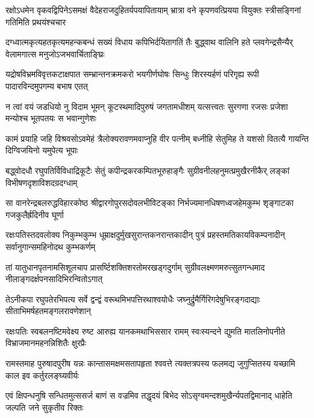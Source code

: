 \fourlineindentedshloka
{रक्षोऽधमेन वृकवद्विपिनेऽसमक्षं}
{वैदेहराजदुहितर्यपयापितायाम्}
{भ्रात्रा वने कृपणवत्प्रियया वियुक्तः}
{स्त्रीसङ्गिनां गतिमिति प्रथयंश्चचार} %

\fourlineindentedshloka
{दग्ध्वात्मकृत्यहतकृत्यमहन्कबन्धं}
{सख्यं विधाय कपिभिर्दयितागतिं तैः}
{बुद्ध्वाथ वालिनि हते प्लवगेन्द्रसैन्यैर्}
{वेलामगात्स मनुजोऽजभवार्चिताङ्घ्रिः} %

\fourlineindentedshloka
{यद्रोषविभ्रमविवृत्तकटाक्षपात}
{सम्भ्रान्तनक्रमकरो भयगीर्णघोषः}
{सिन्धुः शिरस्यर्हणं परिगृह्य रूपी}
{पादारविन्दमुपगम्य बभाष एतत्} %

\fourlineindentedshloka
{न त्वां वयं जडधियो नु विदाम भूमन्}
{कूटस्थमादिपुरुषं जगतामधीशम्}
{यत्सत्त्वतः सुरगणा रजसः प्रजेशा}
{मन्योश्च भूतपतयः स भवान्गुणेशः} %

\fourlineindentedshloka
{कामं प्रयाहि जहि विश्रवसोऽवमेहं}
{त्रैलोक्यरावणमवाप्नुहि वीर पत्नीम्}
{बध्नीहि सेतुमिह ते यशसो वितत्यै}
{गायन्ति दिग्विजयिनो यमुपेत्य भूपाः} %

\fourlineindentedshloka
{बद्ध्वोदधौ रघुपतिर्विविधाद्रिकूटैः}
{सेतुं कपीन्द्रकरकम्पितभूरुहाङ्गैः}
{सुग्रीवनीलहनुमत्प्रमुखैरनीकैर्}
{लङ्कां विभीषणदृशाविशदग्रदग्धाम्} %

\fourlineindentedshloka
{सा वानरेन्द्रबलरुद्धविहारकोष्ठ}
{श्रीद्वारगोपुरसदोवलभीविटङ्का}
{निर्भज्यमानधिषणध्वजहेमकुम्भ}
{शृङ्गाटका गजकुलैर्ह्रदिनीव घूर्णा} %

\fourlineindentedshloka
{रक्षःपतिस्तदवलोक्य निकुम्भकुम्भ}
{धूम्राक्षदुर्मुखसुरान्तकनरान्तकादीन्}
{पुत्रं प्रहस्तमतिकायविकम्पनादीन्}
{सर्वानुगान्समहिनोदथ कुम्भकर्णम्} %

\fourlineindentedshloka
{तां यातुधानपृतनामसिशूलचाप}
{प्रासर्ष्टिशक्तिशरतोमरखड्गदुर्गाम्}
{सुग्रीवलक्ष्मणमरुत्सुतगन्धमाद}
{नीलाङ्गदर्क्षपनसादिभिरन्वितोऽगात्} %

\fourlineindentedshloka
{तेऽनीकपा रघुपतेरभिपत्य सर्वे}
{द्वन्द्वं वरूथमिभपत्तिरथाश्वयोधैः}
{जघ्नुर्द्रुमैर्गिरिगदेषुभिरङ्गदाद्याः}
{सीताभिमर्षहतमङ्गलरावणेशान्} %

\fourlineindentedshloka
{रक्षःपतिः स्वबलनष्टिमवेक्ष्य रुष्ट}
{आरुह्य यानकमथाभिससार रामम्}
{स्वःस्यन्दने द्युमति मातलिनोपनीते}
{विभ्राजमानमहनन्निशितैः क्षुरप्रैः} %

\fourlineindentedshloka
{रामस्तमाह पुरुषादपुरीष यन्नः}
{कान्तासमक्षमसतापहृता श्ववत्ते}
{त्यक्तत्रपस्य फलमद्य जुगुप्सितस्य}
{यच्छामि काल इव कर्तुरलङ्घ्यवीर्यः} %

\fourlineindentedshloka
{एवं क्षिपन्धनुषि सन्धितमुत्ससर्ज}
{बाणं स वज्रमिव तद्धृदयं बिभेद}
{सोऽसृग्वमन्दशमुखैर्न्यपतद्विमानाद्}
{धाहेति जल्पति जने सुकृतीव रिक्तः} %

